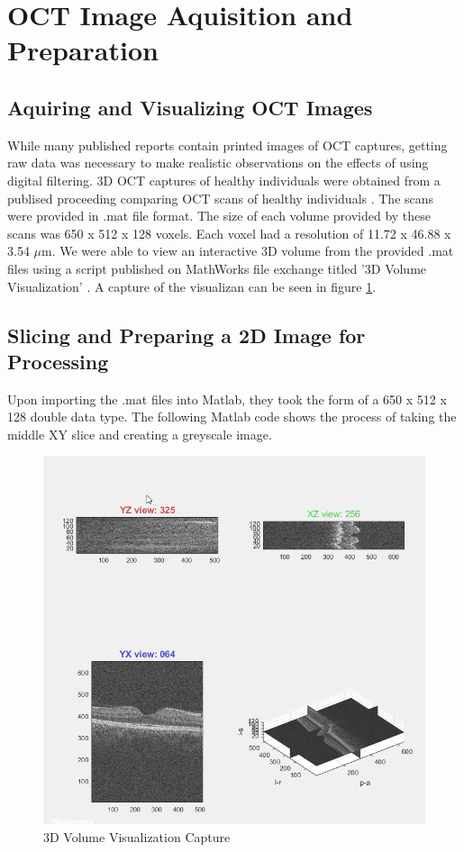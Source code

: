 \documentclass[%
reprint,
showpacs,preprintnumbers,
bibnotes,
amsmath,amssymb,
aps,
pra,
]{revtex4-1}
\begin{document}
	\section{\label{sec:level1} OCT Image Aquisition and Preparation}

	\subsection{\label{sec:level2} Aquiring and Visualizing OCT Images}
	While many published reports contain printed images of OCT captures, getting raw data was necessary to make realistic observations on the effects of using digital filtering. 3D OCT captures of healthy individuals were obtained from a publised proceeding comparing OCT scans of healthy individuals \cite{tahereh_2014}. The scans were provided in .mat file format. The size of each volume provided by these scans was 650 x 512 x 128 voxels. Each voxel had a resolution of 11.72 x 46.88 x 3.54 $\mu$m. We were able to view an interactive 3D volume from the provided .mat files using a script published on MathWorks file exchange titled '3D Volume Visualization' \cite{stough}. A capture of the visualizan can be seen in figure \ref{fig:3dvol}.

	\subsection{\label{sec:level2} Slicing and Preparing a 2D Image for Processing}
	Upon importing the .mat files into Matlab, they took the form of a 650 x 512 x 128 double data type. The following Matlab code shows the process of taking the middle XY slice and creating a greyscale image.
	\begin{figure}
		\centering
		\includegraphics[width=0.7\linewidth]{Figures/3dvol}
		\caption{3D Volume Visualization Capture}
		\label{fig:3dvol}
	\end{figure}
\end{document}
